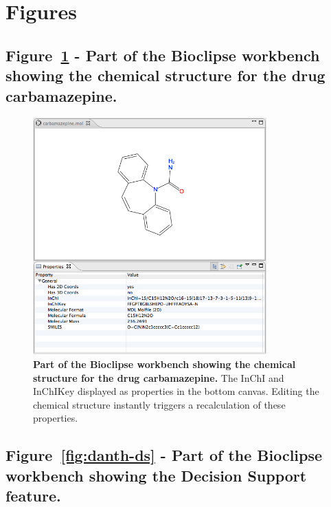 \documentclass[10pt]{bmc_article}
\newenvironment{bmcformat}{\fussy\setboolean{publ}{true}}{\fussy}
\begin{document}
\begin{bmcformat}

\newpage

\section*{Figures}
  \subsection*{Figure~\ref{fig:carba-prop} - Part of the Bioclipse workbench showing the chemical structure for the drug carbamazepine.}
      

\begin{figure}[!hb]
\begin{center}
	\includegraphics[width=9cm]{carbamazepine-props.png}
\caption{\textbf{Part of the Bioclipse workbench showing the chemical structure for the drug carbamazepine.} The InChI and InChIKey displayed as properties in the bottom canvas. Editing the chemical structure instantly triggers a recalculation of these properties.}\label{fig:carba-prop}
\end{center}
\end{figure}

\newpage

\subsection*{Figure~\ref{fig:danth-ds} - Part of the Bioclipse workbench showing the Decision Support feature.}



\end{bmcformat}
\end{document}
